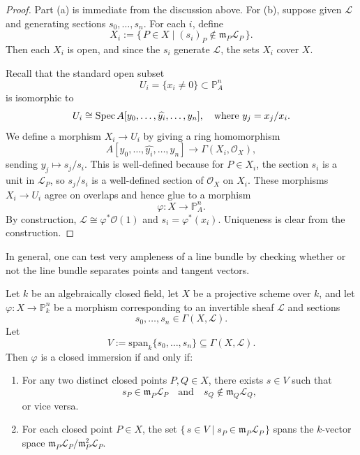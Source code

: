 \documentclass[12pt]{article}
\begin{document}
\begin{proof}
    Part (a) is immediate from the discussion above. For (b), suppose given $\mathcal L$ and generating sections $s_0,\dots,s_n$. For each $i$, define
    \[
        X_i := \{\, P \in X \mid (s_i)_P \notin \mathfrak m_P \mathcal L_P \,\}.
    \]
    Then each $X_i$ is open, and since the $s_i$ generate $\mathcal L$, the sets $X_i$ cover $X$.

    Recall that the standard open subset
    \[
        U_i = \{ x_i \neq 0 \} \subset \mathbb P^n_A
    \]
    is isomorphic to
    \[
        U_i \cong \operatorname{Spec} A[y_0,\dots,\widehat{y_i},\dots,y_n],
        \quad\text{where } y_j = x_j/x_i.
    \] We define a morphism $X_i \to U_i$
    by giving a ring homomorphism
    \[
        A[y_0,\dots,\widehat{y_i},\dots,y_n] \longrightarrow \Gamma(X_i,\mathcal O_X),
    \]
    sending $y_j \longmapsto s_j/s_i$. This is well-defined because for $P \in X_i$, the section $s_i$ is a unit in $\mathcal L_P$, so $s_j/s_i$ is a well-defined section of $\mathcal O_X$ on $X_i$. These morphisms $X_i \to U_i$ agree on overlaps and hence glue to a morphism
    \[
        \varphi : X \to \mathbb P^n_A.
    \]
    By construction, $\mathcal L \cong \varphi^*\mathcal O(1)$ and $s_i = \varphi^*(x_i)$. Uniqueness is clear from the construction.
\end{proof}

In general, one can test very ampleness of a line bundle by checking whether or not the line bundle separates points and tangent vectors.

\begin{proposition}
    Let $k$ be an algebraically closed field, let $X$ be a projective scheme over $k$, and let $\varphi : X \to \mathbb P^n_k$
    be a morphism corresponding to an invertible sheaf $\mathcal L$ and sections
    \[
        s_0,\dots,s_n \in \Gamma(X,\mathcal L).
    \]
    Let
    \[
        V := \mathrm{span}_k\{s_0,\dots,s_n\} \subseteq \Gamma(X,\mathcal L).
    \]
    Then $\varphi$ is a closed immersion if and only if:

    \begin{enumerate}
        \item[(1)] For any two distinct closed points $P,Q \in X$, there exists $s \in V$ such that
              \[
                  s_P \in \mathfrak m_P \mathcal L_P
                  \quad\text{and}\quad
                  s_Q \notin \mathfrak m_Q \mathcal L_Q,
              \]
              or vice versa.

        \item[(2)] For each closed point $P \in X$, the set $\{\, s \in V \mid s_P \in \mathfrak m_P \mathcal L_P \,\}$ spans the $k$-vector space $\mathfrak m_P \mathcal L_P / \mathfrak m_P^2 \mathcal L_P$.
    \end{enumerate}
\end{proposition}
\end{document}
